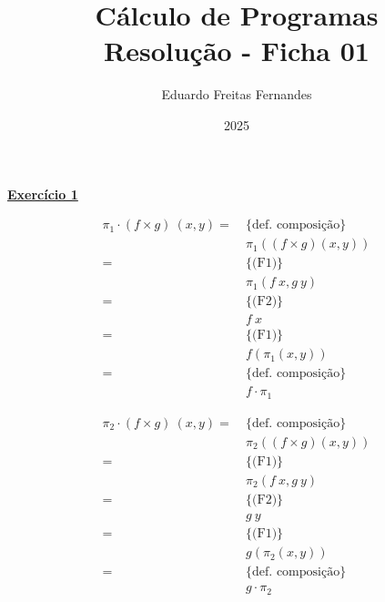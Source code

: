 \documentclass[a4paper,11pt]{article}
\title{Cálculo de Programas \\ Resolução - Ficha 01}
\author{Eduardo Freitas Fernandes}
\date{2025}
\begin{document}
	
\maketitle
	
\noindent \underline{\textbf{Exercício 1}}\\

\begin{minipage}{0.45\textwidth}
\begin{mdframed}
	\[
	\begin{aligned}
		\pi_1 \cdot (f \times g) \  (x, y) 
		= \  &\{\text{def. composição}\}\\
		&\pi_1 ((f \times g) (x, y)) \\
		= \  &\{\text{(F1)}\}\\
		&\pi_1 (f \  x, g \  y) \\
		= \  &\{\text{(F2)}\}\\
		&f \  x \\
		= \  &\{\text{(F1)}\}\\
		&f (\pi_1 (x, y)) \\
		= \  &\{\text{def. composição}\}\\
		&f \cdot \pi_1
	\end{aligned}
	\]
\end{mdframed}	
\end{minipage}
\hfill
\begin{minipage}{0.45\textwidth}
\begin{mdframed}
	\[
	\begin{aligned}
		\pi_2 \cdot (f \times g) \  (x, y) 
		= \  &\{\text{def. composição}\}\\
		&\pi_2 ((f \times g) (x, y)) \\
		= \  &\{\text{(F1)}\}\\
		&\pi_2 (f \  x, g \  y) \\
		= \  &\{\text{(F2)}\}\\
		&g \  y \\
		= \  &\{\text{(F1)}\}\\
		&g (\pi_2 (x, y)) \\
		= \  &\{\text{def. composição}\}\\
		&g \cdot \pi_2
	\end{aligned}
	\]
\end{mdframed}
\end{minipage}
\end{document}
